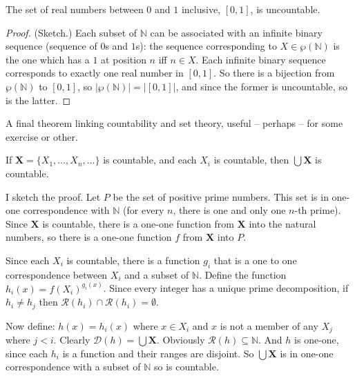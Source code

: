 \begin{theorem}
The set of real numbers between $0$ and $1$ inclusive, $[0,1]$, is uncountable. \begin{proof}
	(Sketch.) Each subset of $\mathbb{N}$ can be associated with an infinite binary sequence (sequence of $0$s and $1$s): the sequence corresponding to $X \in \wp(\mathbb{N})$ is the one which has a $1$ at position $n$ iff $n \in X$. Each infinite binary sequence corresponds to exactly one real number in $[0,1]$. So there is a bijection from $\wp(\mathbb{N})$ to $[0,1]$, so $|\wp(\mathbb{N})| = |[0,1]|$, and since the former is uncountable, so is the latter.
\end{proof}
\end{theorem}


A final theorem linking countability and set theory, useful – perhaps – for some exercise or other.
\begin{theorem}\label{countu}
	If $\mathbf{X} = \{X_{1},\ldots,X_{n},\ldots\}$ is countable, and each $X_{i}$ is countable, then $\bigcup \mathbf{X}$ is countable.
\end{theorem}
I sketch the proof.
Let $P$ be the set of positive prime numbers. This set is in one-one correspondence with $\mathbb{N}$ (for every $n$, there is one and only one $n$-th prime). Since $\mathbf{X}$ is countable, there is a one-one function from $\mathbf{X}$ into the natural numbers, so there is a one-one function $f$ from $\mathbf{X}$ into $P$.

Since each $X_{i}$ is countable, there is a function $g_{i}$ that is a one to one correspondence between $X_{i}$ and a subset of $\mathbb{N}$. Define the function $h_{i}(x) = f(X_{i})^{g_{i}(x)}$. Since every integer has a unique prime decomposition, if $h_{i}\neq h_{j}$ then $\mathcal{R}(h_{i})\cap\mathcal{R}(h_{i})=\emptyset.$

Now define: $h(x) = h_i(x)$ where $x\in X_i$ and $x$ is not a member of any $X_{j}$ where $j < i$. Clearly $\mathcal{D}(h) = \bigcup\mathbf{X}$. Obviously $\mathcal{R}(h) \subseteq \mathbb{N}$. And $h$ is one-one, since each $h_{i}$ is a function and their ranges are disjoint. So $\bigcup\mathbf{X}$ is in one-one correspondence with a subset of $\mathbb{N}$ so is countable. 

